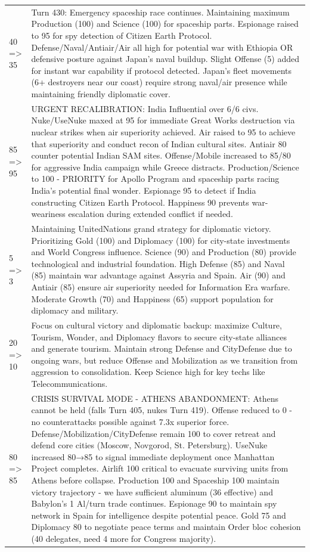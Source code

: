 \begin{longtable}{p{}p{}}
40 => 35 & Turn 430: Emergency spaceship race continues. Maintaining maximum Production (100) and Science (100) for spaceship parts. Espionage raised to 95 for spy detection of Citizen Earth Protocol. Defense/Naval/Antiair/Air all high for potential war with Ethiopia OR defensive posture against Japan's naval buildup. Slight Offense (5) added for instant war capability if protocol detected. Japan's fleet movements (6+ destroyers near our coast) require strong naval/air presence while maintaining friendly diplomatic cover. \\
85 => 95 & URGENT RECALIBRATION: India Influential over 6/6 civs. Nuke/UseNuke maxed at 95 for immediate Great Works destruction via nuclear strikes when air superiority achieved. Air raised to 95 to achieve that superiority and conduct recon of Indian cultural sites. Antiair 80 counter potential Indian SAM sites. Offense/Mobile increased to 85/80 for aggressive India campaign while Greece distracts. Production/Science to 100 - PRIORITY for Apollo Program and spaceship parts racing India's potential final wonder. Espionage 95 to detect if India constructing Citizen Earth Protocol. Happiness 90 prevents war-weariness escalation during extended conflict if needed. \\
5 => 3 & Maintaining UnitedNations grand strategy for diplomatic victory. Prioritizing Gold (100) and Diplomacy (100) for city-state investments and World Congress influence. Science (90) and Production (80) provide technological and industrial foundation. High Defense (85) and Naval (85) maintain war advantage against Assyria and Spain. Air (90) and Antiair (85) ensure air superiority needed for Information Era warfare. Moderate Growth (70) and Happiness (65) support population for diplomacy and military. \\
20 => 10 & Focus on cultural victory and diplomatic backup: maximize Culture, Tourism, Wonder, and Diplomacy flavors to secure city-state alliances and generate tourism. Maintain strong Defense and CityDefense due to ongoing wars, but reduce Offense and Mobilization as we transition from aggression to consolidation. Keep Science high for key techs like Telecommunications. \\
80 => 85 & CRISIS SURVIVAL MODE - ATHENS ABANDONMENT: Athens cannot be held (falls Turn 405, nukes Turn 419). Offense reduced to 0 - no counterattacks possible against 7.3x superior force. Defense/Mobilization/CityDefense remain 100 to cover retreat and defend core cities (Moscow, Novgorod, St. Petersburg). UseNuke increased 80→85 to signal immediate deployment once Manhattan Project completes. Airlift 100 critical to evacuate surviving units from Athens before collapse. Production 100 and Spaceship 100 maintain victory trajectory - we have sufficient aluminum (36 effective) and Babylon's 1 Al/turn trade continues. Espionage 90 to maintain spy network in Spain for intelligence despite potential peace. Gold 75 and Diplomacy 80 to negotiate peace terms and maintain Order bloc cohesion (40 delegates, need 4 more for Congress majority). \\

\end{longtable}
